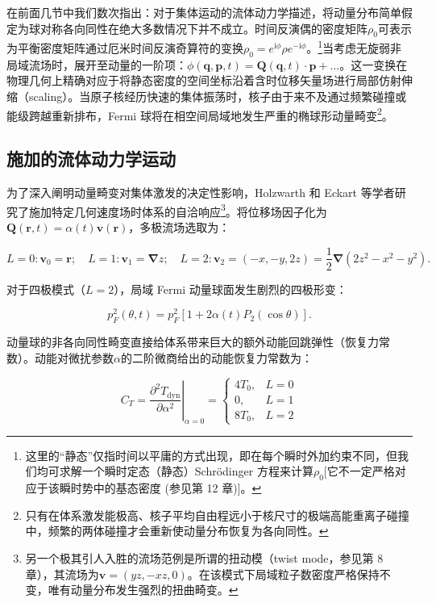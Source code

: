 在前面几节中我们数次指出：对于集体运动的流体动力学描述，将动量分布简单假定为球对称各向同性在绝大多数情况下并不成立。时间反演偶的密度矩阵$\rho_{0}$可表示为平衡密度矩阵通过厄米时间反演奇算符的变换$\rho_{0}=e^{\mathrm{i}\phi}\rho e^{-\mathrm{i}\phi}$。\footnote{这里的“静态”仅指时间以平庸的方式出现，即在每个瞬时外加约束不同，但我们均可求解一个瞬时定态（静态）Schrödinger 方程来计算$\rho_{0}${[}它不一定严格对应于该瞬时势中的基态密度
(参见第 12 章){]}。}当考虑无旋弱非局域流场时，展开至动量的一阶项：$\phi(\boldsymbol{q},\boldsymbol{p},t)=\boldsymbol{Q}(\boldsymbol{q},t)\cdot\boldsymbol{p}+\dots$。这一变换在物理几何上精确对应于将静态密度的空间坐标沿着含时位移矢量场进行局部仿射伸缩（scaling）。当原子核经历快速的集体振荡时，核子由于来不及通过频繁碰撞或能级跨越重新排布，Fermi
球将在相空间局域地发生严重的椭球形动量畸变\footnote{只有在体系激发能极高、核子平均自由程远小于核尺寸的极端高能重离子碰撞中，频繁的两体碰撞才会重新使动量分布恢复为各向同性。}。

\subsection{施加的流体动力学运动\label{subsec:13.3.6_=0065BD=0052A0=006D41=004F53=008FD0=0052A8}}

为了深入阐明动量畸变对集体激发的决定性影响，Holzwarth 和 Eckart \cite{HE78,HE79} 等学者研究了施加特定几何速度场时体系的自洽响应\footnote{另一个极其引人入胜的流场范例是所谓的扭动模（twist mode，参见第 8 章），其流场为$\boldsymbol{v}=(yz,-xz,0)$\cite{HE77,HE79}。在该模式下局域粒子数密度严格保持不变，唯有动量分布发生强烈的扭曲畸变。}。将位移场因子化为$\boldsymbol{Q}(\boldsymbol{r},t)=\alpha(t)\boldsymbol{v}(\boldsymbol{r})$，多极流场选取为：

\[
L=0:\boldsymbol{v}_{0}=\boldsymbol{r};\quad L=1:\boldsymbol{v}_{1}=\boldsymbol{\nabla}z;\quad L=2:\boldsymbol{v}_{2}=(-x,-y,2z)=\frac{1}{2}\boldsymbol{\nabla}(2z^{2}-x^{2}-y^{2}).
\]

对于四极模式（$L=2$），局域 Fermi 动量球面发生剧烈的四极形变：

\[
p^{2}_{F}(\theta,t)=p^{2}_{F}\left[1+2\alpha(t)P_{2}(\cos\theta)\right].
\]

动量球的非各向同性畸变直接给体系带来巨大的额外动能回跳弹性（恢复力常数）。动能对微扰参数$\alpha$的二阶微商给出的动能恢复力常数为：

\[
C_{T}=\left.\frac{\partial^{2}T_{\mathrm{dyn}}}{\partial\alpha^{2}}\right|_{\alpha=0}=\begin{cases}
4T_{0}, & L=0\\
0, & L=1\\
8T_{0}, & L=2
\end{cases}
\]


